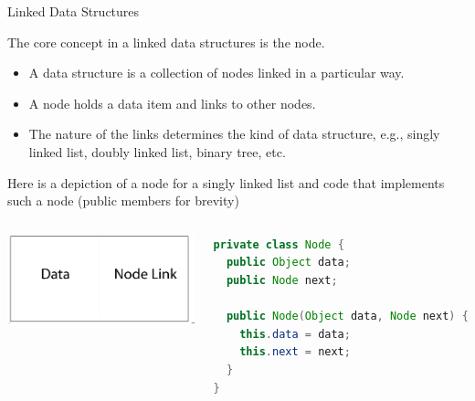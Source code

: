 \documentclass{beamer}
\begin{document}
\begin{frame}[fragile]{Linked Data Structures}

\vspace{-.1in}
The core concept in a  linked data structures is the node.

\begin{itemize}
\item A data structure is a collection of nodes linked in a particular way.
\item A node holds a data item and links to other nodes.
\item The nature of the links determines the kind of data structure, e.g., singly linked list, doubly linked list, binary tree, etc.
\end{itemize}

Here is a depiction of a node for a singly linked list and code that implements such a node (public members for brevity)

\begin{columns}[t]
\begin{column}{2in}
\begin{center}
\includegraphics[height=1in]{node.png}
\end{center}
\end{column}
\begin{column}{2.75in}
\begin{lstlisting}[language=Java, frame=none]
private class Node {
  public Object data;
  public Node next;

  public Node(Object data, Node next) {
    this.data = data;
    this.next = next;
  }
}
\end{lstlisting}
\end{column}
\end{columns}


\end{frame}
\end{document}
